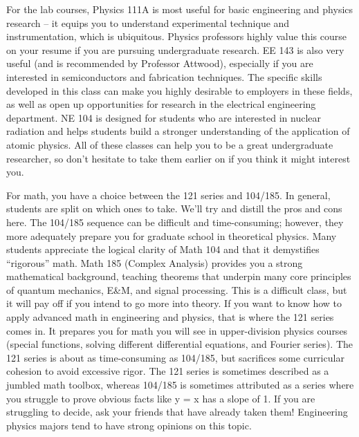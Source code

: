 For the lab courses, Physics 111A is most useful for basic engineering and physics research – it equips you to understand experimental technique and instrumentation, which is ubiquitous.  Physics professors highly value this course on your resume if you are pursuing undergraduate research. EE 143 is also very useful (and is recommended by Professor Attwood), especially if you are interested in semiconductors and fabrication techniques.  The specific skills developed in this class can make you highly desirable to employers in these fields, as well as open up opportunities for research in the electrical engineering department. NE 104 is designed for students who are interested in nuclear radiation and helps students build a stronger understanding of the application of atomic physics. All of these classes can help you to be a great undergraduate researcher, so don’t hesitate to take them earlier on if you think it might interest you.
 
For math, you have a choice between the 121 series and 104/185. In general, students are split on which ones to take. We’ll try and distill the pros and cons here. The 104/185 sequence can be difficult and time-consuming; however, they more adequately prepare you for graduate school in theoretical physics. Many students appreciate the logical clarity of Math 104 and that it demystifies “rigorous” math. Math 185 (Complex Analysis) provides you a strong mathematical background, teaching theorems that underpin many core principles of quantum mechanics, E\&M, and signal processing.  This is a difficult class, but it will pay off if you intend to go more into theory.  If you want to know how to apply advanced math in engineering and physics, that is where the 121 series comes in. It prepares you for math you will see in upper-division physics courses (special functions, solving different differential equations, and Fourier series). The 121 series is about as time-consuming as 104/185, but sacrifices some curricular cohesion to avoid excessive rigor.  The 121 series is sometimes described as a jumbled math toolbox, whereas 104/185 is sometimes attributed as a series where you struggle to prove obvious facts like y = x has a slope of 1.  If you are struggling to decide, ask your friends that have already taken them!  Engineering physics majors tend to have strong opinions on this topic.
 
